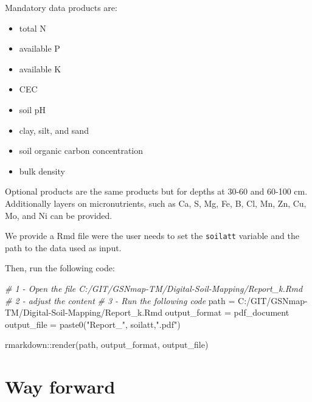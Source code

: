 \documentclass[
  10pt,
  b5paper,
  oneside]{book}
\newenvironment{Shaded}{\begin{snugshade}}{\end{snugshade}}
\newcommand{\CommentTok}[1]{\textcolor[rgb]{0.56,0.35,0.01}{\textit{#1}}}
\newcommand{\FunctionTok}[1]{\textcolor[rgb]{0.00,0.00,0.00}{#1}}
\newcommand{\NormalTok}[1]{#1}
\newcommand{\OtherTok}[1]{\textcolor[rgb]{0.56,0.35,0.01}{#1}}
\newcommand{\SpecialCharTok}[1]{\textcolor[rgb]{0.00,0.00,0.00}{#1}}
\newcommand{\StringTok}[1]{\textcolor[rgb]{0.31,0.60,0.02}{#1}}
\providecommand{\tightlist}{%
  \setlength{\itemsep}{0pt}\setlength{\parskip}{0pt}}
\begin{document}
Mandatory data products are:

\begin{itemize}
\tightlist
\item
  total N
\item
  available P
\item
  available K
\item
  CEC
\item
  soil pH
\item
  clay, silt, and sand
\item
  soil organic carbon concentration
\item
  bulk density
\end{itemize}

Optional products are the same products but for depths at 30-60 and 60-100 cm. Additionally layers on micronutrients, such as Ca, S, Mg, Fe, B, Cl, Mn, Zn, Cu, Mo, and Ni can be provided.

We provide a Rmd file were the user needs to set the \texttt{soilatt} variable and the path to the data used as input.

Then, run the following code:

\begin{Shaded}
\begin{Highlighting}[]
\CommentTok{\# 1 {-} Open the file C:/GIT/GSNmap{-}TM/Digital{-}Soil{-}Mapping/Report\_k.Rmd}
\CommentTok{\# 2 {-} adjust the content}
\CommentTok{\# 3 {-} Run the following code}
\NormalTok{path }\OtherTok{=} \StringTok{\textquotesingle{}C:/GIT/GSNmap{-}TM/Digital{-}Soil{-}Mapping/Report\_k.Rmd\textquotesingle{}}
\NormalTok{output\_format }\OtherTok{=} \StringTok{\textquotesingle{}pdf\_document\textquotesingle{}}
\NormalTok{output\_file }\OtherTok{=} \FunctionTok{paste0}\NormalTok{(}\StringTok{"Report\_"}\NormalTok{, soilatt,}\StringTok{".pdf"}\NormalTok{)}

\NormalTok{rmarkdown}\SpecialCharTok{::}\FunctionTok{render}\NormalTok{(path, output\_format, output\_file)}
\end{Highlighting}
\end{Shaded}

\hypertarget{way-forward}{%
\chapter{Way forward}\label{way-forward}}
\end{document}
